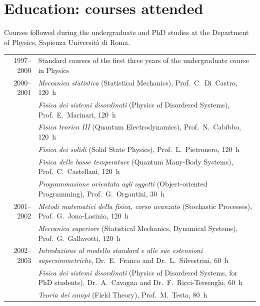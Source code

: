 \documentclass[a4paper,10pt]{article}
\begin{document}
\clearpage
\section{Education: courses attended}

{\small Courses followed during the undergraduate and PhD studies at the Department of Physics, Sapienza Universit\`a di Roma.}

\vspace{8pt}
\begin{tabularx}{\textwidth}{@{}D L@{}}
1997--2000 & Standard courses of the first three years of the undergraduate course in Physics \\
2000--2001 & \emph{Meccanica statistica} (Statistical Mechanics), Prof.~C.~Di~Castro, 120~h \\
 & \emph{Fisica dei sistemi disordinati} (Physics of Disordered Systems), Prof.~E.~Marinari, 120~h \\
 & \emph{Fisica teorica III} (Quantum Electrodynamics), Prof.~N.~Cabibbo, 120~h \\
 & \emph{Fisica dei solidi} (Solid State Physics), Prof.~L.~Pietronero, 120~h \\
 & \emph{Fisica delle basse temperature} (Quantum Many-Body Systems), Prof.~C.~Castellani, 120~h \\
 & \emph{Programmazione orientata agli oggetti} (Object-oriented Programming), Prof.~G.~Organtini, 30~h \\
2001--2002 & \emph{Metodi matematici della fisica, corso avanzato} (Stochastic Processes), Prof.~G.~Jona-Lasinio, 120~h \\
 & \emph{Meccanica superiore} (Statistical Mechanics, Dynamical Systems), Prof.~G.~Gallavotti, 120~h \\
2002--2003 & \emph{Introduzione al modello standard e alle sue estensioni supersimmetriche}, Dr.~E.~Franco and Dr.~L.~Silvestrini, 60~h \\
 & \emph{Fisica dei sistemi disordinati} (Physics of Disordered Systems, for PhD students), Dr.~A.~Cavagna and Dr.~F.~Ricci-Tersenghi, 60~h \\
 & \emph{Teoria dei campi} (Field Theory), Prof.~M.~Testa, 80~h \\
\end{tabularx}
\end{document}
